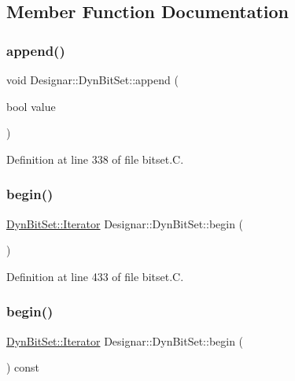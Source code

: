\subsection{Member Function Documentation}
\mbox{\label{class_designar_1_1_dyn_bit_set_a061298007ec0f5743f1f7f7f7e87988c}} 
\subsubsection{\texorpdfstring{append()}{append()}}
{\footnotesize\ttfamily void Designar\+::\+Dyn\+Bit\+Set\+::append (\begin{DoxyParamCaption}\item[{bool}]{value }\end{DoxyParamCaption})}



Definition at line 338 of file bitset.\+C.

\mbox{\label{class_designar_1_1_dyn_bit_set_a40cde0bc849513bbad925b4733d777f6}} 
\subsubsection{\texorpdfstring{begin()}{begin()}\hspace{0.1cm}{\footnotesize\ttfamily [1/2]}}
{\footnotesize\ttfamily \hyperlink{class_designar_1_1_dyn_bit_set_1_1_iterator}{Dyn\+Bit\+Set\+::\+Iterator} Designar\+::\+Dyn\+Bit\+Set\+::begin (\begin{DoxyParamCaption}{ }\end{DoxyParamCaption})}



Definition at line 433 of file bitset.\+C.

\mbox{\label{class_designar_1_1_dyn_bit_set_a73c8564a300f36934b2de273c1f8eb18}} 
\subsubsection{\texorpdfstring{begin()}{begin()}\hspace{0.1cm}{\footnotesize\ttfamily [2/2]}}
{\footnotesize\ttfamily \hyperlink{class_designar_1_1_dyn_bit_set_1_1_iterator}{Dyn\+Bit\+Set\+::\+Iterator} Designar\+::\+Dyn\+Bit\+Set\+::begin (\begin{DoxyParamCaption}{ }\end{DoxyParamCaption}) const}



